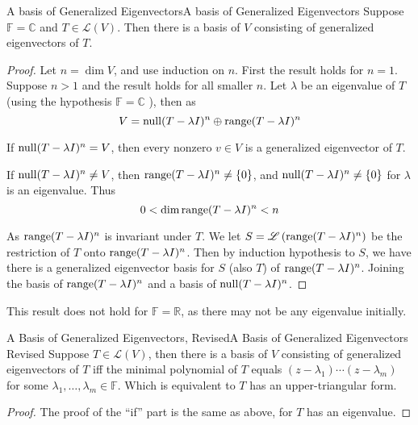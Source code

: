 \documentclass[../main.tex]{subfiles}
\begin{document}
\begin{theorem}{A basis of Generalized Eigenvectors}{A basis of Generalized Eigenvectors}
Suppose $\mathbb{F}=\mathbb{C}$ and $T\in \mathscr{L}(V)$. Then there is a basis of $V$ consisting of generalized eigenvectors of $T$.
\end{theorem}
\begin{proof}
Let $n=\dim V$, and use induction on $n$. First the result holds for $n=1$. Suppose $n > 1$ and the result holds for all smaller $n$. Let $\lambda$ be an eigenvalue of $T$ (using the hypothesis $\mathbb{F}=\mathbb{C}$ ), then as
\begin{equation*}
V = \operatorname{null} (T-\lambda I)^n \oplus \operatorname{range} (T-\lambda I)^n
\end{equation*}

If $\operatorname{null} (T-\lambda I)^n = V$, then every nonzero $v\in V$ is a generalized eigenvector of $T$.

If $\operatorname{null} (T-\lambda I)^n \neq V$, then $\operatorname{range} (T-\lambda I)^n \neq \left\{ 0 \right\}$, and $\operatorname{null} (T-\lambda I)^n \neq \left\{ 0 \right\}$ for  $\lambda$ is an eigenvalue. Thus
\begin{equation*}
0 < \dim \operatorname{range} (T-\lambda I)^n < n
\end{equation*}

As $\operatorname{range} (T- \lambda I)^n$ is invariant under $T$. We let $S = \mathscr{L} \left(\operatorname{range} (T- \lambda I)^n\right)$ be the restriction of $T$ onto $\operatorname{range} (T- \lambda I)^n$. Then by induction hypothesis to $S$, we have there is a generalized eigenvector basis for $S$ (also $T$) of $\operatorname{range} (T- \lambda I)^n$. Joining the basis of  $\operatorname{range} (T- \lambda I)^n$ and a basis of $\operatorname{null} (T-\lambda I)^n$.
\end{proof}

\begin{remark}
This result does not hold for $\mathbb{F}=\mathbb{R}$, as there may not be any eigenvalue initially.
\end{remark}

\begin{theorem}{A Basis of Generalized Eigenvectors, Revised}{A Basis of Generalized Eigenvectors Revised}
Suppose $T\in \mathscr{L}(V)$, then there is a basis of $V$ consisting of generalized eigenvectors of $T$ iff the minimal polynomial of $T$ equals $(z-\lambda_1) \cdots (z-\lambda_m)$ for some $\lambda_1, \ldots ,\lambda_m \in \mathbb{F}$. Which is equivalent to $T$ has an upper-triangular form.
\end{theorem}
\begin{proof}
	The proof of the ``if'' part is the same as above, for $T$ has an eigenvalue.
\end{proof}
\end{document}
